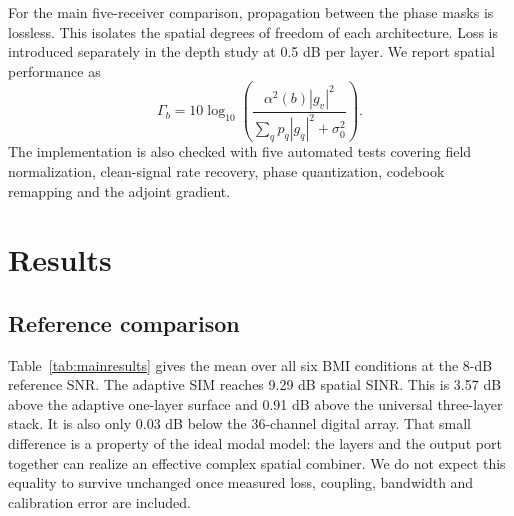 \documentclass[pdflatex,sn-nature]{sn-jnl}
\begin{document}
For the main five-receiver comparison, propagation between the phase masks is
lossless. This isolates the spatial degrees of freedom of each architecture. Loss is
introduced separately in the depth study at 0.5 dB per layer. We report spatial
performance as
\begin{equation}
\Gamma_b=10\log_{10}\!\left(
\frac{\alpha^2(b)|g_v|^2}
{\sum_qp_q|g_q|^2+\sigma_0^2}\right).
\label{eq:sinr}
\end{equation}
The implementation is also checked with five automated tests covering field
normalization, clean-signal rate recovery, phase quantization, codebook remapping and
the adjoint gradient.

\section{Results}

\subsection{Reference comparison}
Table~\ref{tab:mainresults} gives the mean over all six BMI conditions at the 8-dB
reference SNR. The adaptive SIM reaches 9.29 dB spatial SINR. This is 3.57 dB above
the adaptive one-layer surface and 0.91 dB above the universal three-layer stack. It
is also only 0.03 dB below the 36-channel digital array. That small difference is a
property of the ideal modal model: the layers and the output port together can realize
an effective complex spatial combiner. We do not expect this equality to survive
unchanged once measured loss, coupling, bandwidth and calibration error are included.

\begin{table}[htbp]
\caption{Reference results at 8-dB single-antenna SNR (simulation only)}
\label{tab:mainresults}
\centering
{}
\end{table}
\end{document}
